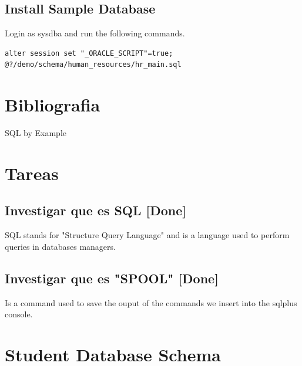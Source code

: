 \documentclass[twoside]{article}
\begin{document}
\subsection{Install Sample Database}
Login as sysdba and run the following commands.
\begin{verbatim}
alter session set "_ORACLE_SCRIPT"=true;
@?/demo/schema/human_resources/hr_main.sql
\end{verbatim}
\section{Bibliografia}

SQL by Example

\section{Tareas}
\subsection{Investigar que es SQL [Done]}
SQL stands for "Structure Query Language" and is a language used to perform queries in databases managers.
\subsection{Investigar que es "SPOOL" [Done]}
Is a command used to save the ouput of the commands we insert into the sqlplus console.
\section{Student Database Schema}

\end{document}
